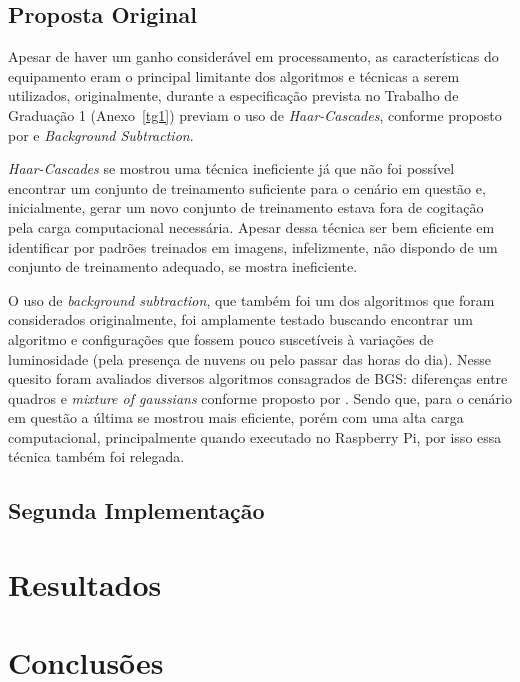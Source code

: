 \documentclass[ecp,tc]{iiufrgs}
\begin{document}
\section{Proposta Original}

Apesar de haver um ganho considerável em processamento, as características do equipamento eram o principal limitante dos algoritmos e técnicas a serem utilizados, originalmente, durante a especificação prevista no Trabalho de Graduação 1 (Anexo~\ref{tg1}) previam o uso de \textit{Haar-Cascades}, conforme proposto por  e \textit{Background Subtraction}. 

\textit{Haar-Cascades} se mostrou uma técnica ineficiente já que não foi possível encontrar um conjunto de treinamento suficiente para o cenário em questão e, inicialmente, gerar um novo conjunto de treinamento estava fora de cogitação pela carga computacional necessária. Apesar dessa técnica ser bem eficiente em identificar por padrões treinados em imagens, infelizmente, não dispondo de um conjunto de treinamento adequado, se mostra ineficiente.

O uso de \textit{background subtraction}, que também foi um dos algoritmos que foram considerados originalmente, foi amplamente testado buscando encontrar um algoritmo e configurações que fossem pouco suscetíveis à variações de luminosidade (pela presença de nuvens ou pelo passar das horas do dia). Nesse quesito foram avaliados diversos algoritmos consagrados de BGS: diferenças entre quadros e \textit{mixture of gaussians} conforme proposto por . Sendo que, para o cenário em questão a última se mostrou mais eficiente, porém com uma alta carga computacional, principalmente quando executado no Raspberry Pi, por isso essa técnica também foi relegada.


\section{Segunda Implementação}





\chapter{Resultados}

\chapter{Conclusões}
\end{document}
